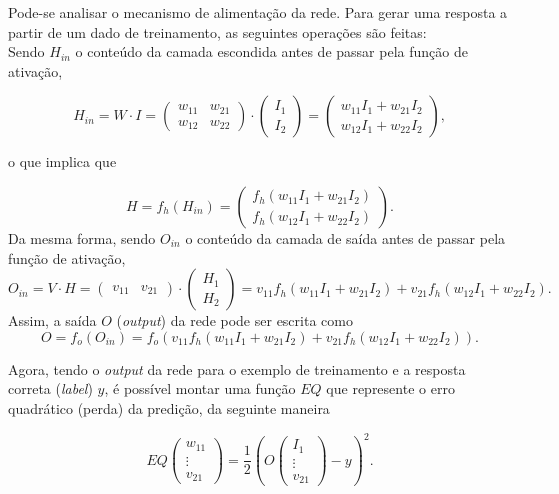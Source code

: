 \documentclass[a4paper,12pt]{article}
\begin{document}
Pode-se analisar o mecanismo de alimentação da rede. Para gerar uma resposta a partir de um dado de treinamento, as seguintes operações são feitas:\\

Sendo $H_{in}$ o conteúdo da camada escondida antes de passar pela função de ativação,


$$
    H_{in} = W \cdot I = \begin{pmatrix}w_{11}&w_{21}\\w_{12}&w_{22}\end{pmatrix} \cdot \begin{pmatrix}I_1\\I_{2}\end{pmatrix} = \begin{pmatrix}w_{11}I_1 + w_{21}I_2 \\ w_{12}I_1 + w_{22}I_2 \end{pmatrix},
$$

o que implica que
   
$$
	 H = f_h(H_{in})=\begin{pmatrix}f_h(w_{11}I_1 + w_{21}I_2) \\ f_h(w_{12}I_1 + w_{22}I_2) \end{pmatrix}.
$$  
Da mesma forma, sendo $O_{in}$ o conteúdo da camada de saída antes de passar pela função de ativação,
$$  
    O_{in} = V \cdot H = \begin{pmatrix}v_{11}&v_{21}\end{pmatrix} \cdot \begin{pmatrix}H_1\\H_2\end{pmatrix}  
    = v_{11}f_h(w_{11}I_1 + w_{21}I_2) + v_{21}f_h(w_{12}I_1 + w_{22}I_2).   
$$
Assim, a saída $O$ (\textit{output}) da rede pode ser escrita como  
$$
    O = f_o(O_{in}) = f_o(v_{11}f_h(w_{11}I_1 + w_{21}I_2) + v_{21}f_h(w_{12}I_1 + w_{22}I_2)).
$$

Agora, tendo o \textit{output} da rede para o exemplo de treinamento e a resposta correta (\textit{label}) $y$, é possível montar uma função $EQ$ que represente o erro quadrático (perda) da predição, da seguinte maneira


$$
    EQ\begin{pmatrix}w_{11}\\\vdots\\v_{21}\end{pmatrix} = \frac{1}{2}\left(O\begin{pmatrix}I_{1}\\ \vdots \\v_{21} \end{pmatrix} - y\right)^2 .
$$
\end{document}
